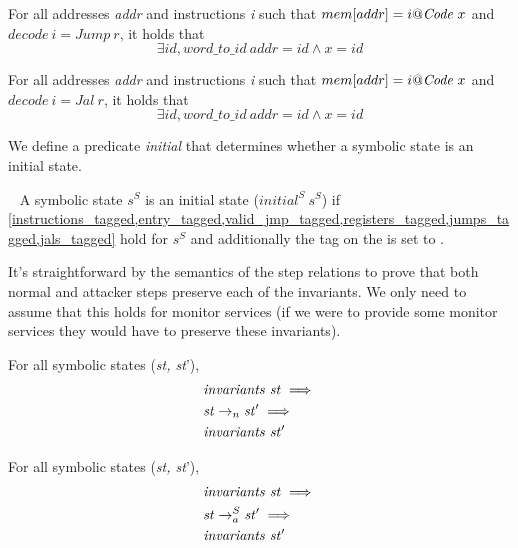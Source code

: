 \begin{definition}\label{jumps_tagged}
  For all addresses \textit{addr} and instructions \textit{i} such
  that $\rd{mem}{addr}=\atom{i}{\INSTR{x}}$ and $decode~i = Jump~r$, it holds that
  $$\exists id, word\_to\_id~addr = id \land x = id$$
\end{definition}

\begin{definition}\label{jals_tagged}
  For all addresses \textit{addr} and instructions \textit{i} such
  that $\rd{mem}{addr}=\atom{i}{\INSTR{x}}$ and $decode~i = Jal~r$, it holds that
  $$\exists id, word\_to\_id~addr = id \land x = id$$
\end{definition}

We define a predicate \emph{initial} that determines whether a symbolic
state is an initial state.

\begin{definition}\label{symbolic_initial_pred}
  ~ A symbolic state $s^S$ is an initial state ($initial^S ~ s^S$) if
  \cref{instructions_tagged,entry_tagged,valid_jmp_tagged,registers_tagged,jumps_tagged,jals_tagged}
  hold for $s^S$ and additionally the tag on the \pc is set to
  \DATAname.
\end{definition}

It's straightforward by the semantics of the step relations to prove
that both normal and attacker steps preserve each of the invariants.
We only need to assume that this holds for monitor services (\IE if we
were to provide some monitor services they would have to preserve
these invariants).

\begin{lemma}
\label{step_preserves_invariants}
For all symbolic states (\textit{st, st}'),
\begin{align*}
  & \mathit{invariants}~\mathit{st} \implies \\
  & \stepn{\mathit{st}}{\mathit{st}'} \implies \\
  & \mathit{invariants}~\mathit{st}'
\end{align*}
\end{lemma}

\begin{lemma}
\label{step_a_preserves_invariants}
For all symbolic states (\textit{st, st}'),
\begin{align*}
  & \mathit{invariants}~\mathit{st} \implies \\
  & \stepa{\mathit{st}}{\mathit{st}'}{S} \implies \\
  & \mathit{invariants}~\mathit{st}'
\end{align*}
\end{lemma}

